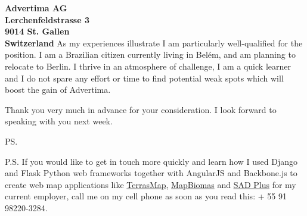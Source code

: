 \documentclass[a4paper]{joaosoares-letter}
\begin{document}
\begin{letter}{\bfseries Advertima AG\\Lerchenfeldstrasse 3\\9014 St. Gallen\\Switzerland}
As my experiences illustrate I am particularly well-qualified for the position. I am a Brazilian citizen currently living in Belém, and am planning to relocate to Berlin. I thrive in an atmosphere of challenge, I am a quick learner and I do not spare any effort or time to find potential weak spots which will boost the gain of Advertima.

\closing{Thank you very much in advance for your consideration. I look forward to speaking with you next week.}
\vspace{10pt}
\ps


P.S. If you would like to get in touch more quickly and learn how I used Django and Flask Python web frameworks together with AngularJS and Backbone.js to create web map applications like \href{https://goo.gl/6gUzPA}{TerrasMap}, \href{https://goo.gl/eYX5SW}{MapBiomas} and \href{https://goo.gl/2J41hR}{SAD Plus} for my current employer, call me on my cell phone as soon as you read this: + 55 91 98220-3284.
\vspace{\fill}

\end{letter}
\end{document}
